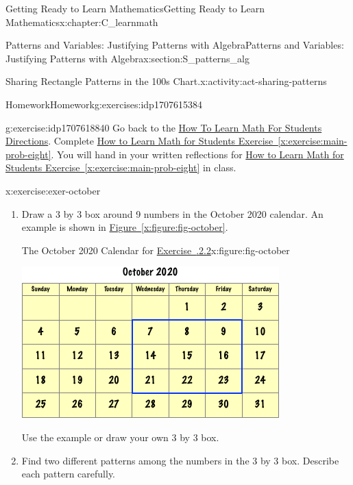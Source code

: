 \documentclass[oneside,10pt,]{book}
\newcommand{\xreffont}{\relax}
\numberwithin{equation}{chapter}
\begin{document}
\begin{chapterptx}{Getting Ready to Learn Mathematics}{}{Getting Ready to Learn Mathematics}{}{}{x:chapter:C_learnmath}
\begin{sectionptx}{Patterns and Variables: Justifying Patterns with Algebra}{}{Patterns and Variables: Justifying Patterns with Algebra}{}{}{x:section:S_patterns_alg}
\begin{activity}{Sharing Rectangle Patterns in the 100s Chart.}{x:activity:act-sharing-patterns}
\end{activity}%
%
%
\typeout{************************************************}
\typeout{************************************************}
%
\begin{exercises-subsection}{Homework}{}{Homework}{}{}{g:exercises:idp1707615384}
\begin{divisionexercise}{1}{}{}{g:exercise:idp1707618840}%
Go back to the \hyperlink{x:paragraphs:htlmfs-directions}{How To Learn Math For Students Directions}. Complete \hyperref[x:exercise:main-prob-eight]{How to Learn Math for Students Exercise~{\xreffont\ref{x:exercise:main-prob-eight}}}. You will hand in your written reflections for \hyperref[x:exercise:main-prob-eight]{How to Learn Math for Students Exercise~{\xreffont\ref{x:exercise:main-prob-eight}}} in class.%
\end{divisionexercise}%
\begin{divisionexercise}{2}{}{}{x:exercise:exer-october}%
\begin{enumerate}[font=\bfseries,label=(\alph*),ref=\alph*]
\item{}Draw a 3 by 3 box around 9 numbers in the October 2020 calendar. An example is shown in \hyperref[x:figure:fig-october]{Figure~{\xreffont\ref{x:figure:fig-october}}}.%
\begin{figureptx}{The October 2020 Calendar for \hyperlink{x:exercise:exer-october}{Exercise~{\xreffont 1.8.2.2}}}{x:figure:fig-october}{}%
\begin{image}{0.15}{0.7}{0.15}%
\includegraphics[width=\linewidth]{external/oct-calendar.pdf}
\end{image}%
\tcblower
\end{figureptx}%
Use the example or draw your own 3 by 3 box.%
\item\label{x:task:tsk-oct-b}Find two different patterns among the numbers in the 3 by 3 box. Describe each pattern carefully.%

\end{enumerate}
\end{divisionexercise}
\end{exercises-subsection}
\end{sectionptx}
\end{chapterptx}
\end{document}
